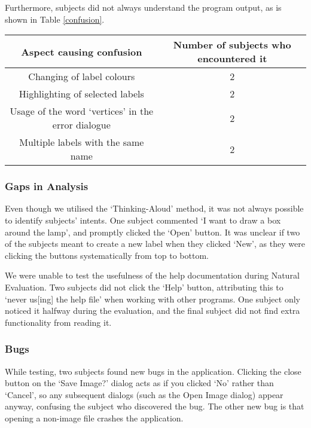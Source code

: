 \documentclass[11pt,twocolumn]{article}
\begin{document}
Furthermore, subjects did not always understand the program output, as is 
shown in Table \ref{confusion}.

\begin{table*}
\begin{tabular}{|c|c|}
\hline
Aspect causing confusion & Number of subjects who encountered it \\
\hline
Changing of label colours & 2 \\
Highlighting of selected labels & 2 \\
Usage of the word `vertices' in the error dialogue & 2 \\
Multiple labels with the same name & 2 \\
\hline
\end{tabular}
\caption{Aspects that caused subjects to be confused during Natural Evaluation.}
\label{confusion}
\end{table*}

\subsubsection{Gaps in Analysis}

Even though we utilised the `Thinking-Aloud' method, it was not always possible
to identify subjects’ intents. One subject commented `I want to draw a box
around the lamp', and promptly clicked the `Open' button. It was unclear if two
of the subjects meant to create a new label when they clicked `New', as they
were clicking the buttons systematically from top to bottom.

We were unable to test the usefulness of the help documentation during Natural
Evaluation. Two subjects did not click the `Help' button, attributing this to
`never us[ing] the help file' when working with other programs. One subject
only noticed it halfway during the evaluation, and the final subject did not
find extra functionality from reading it.

\subsubsection{Bugs}

While testing, two subjects found new bugs in the application. Clicking the
close button on the `Save Image?' dialog acts as if you clicked `No' rather
than `Cancel', so any subsequent dialogs (such as the Open Image dialog) appear
anyway, confusing the subject who discovered the bug. The other new bug is that
opening a non-image file crashes the application.
\end{document}

